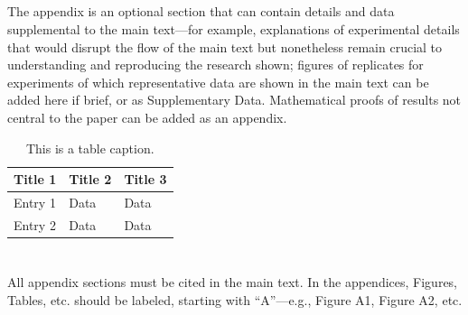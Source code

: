 \documentclass[journal,article,submit,pdftex,moreauthors]{Definitions/mdpi}
\begin{document}
\subsection[\appendixname~\thesubsection]{}
The appendix is an optional section that can contain details and data supplemental to the main text---for example, explanations of experimental details that would disrupt the flow of the main text but nonetheless remain crucial to understanding and reproducing the research shown; figures of replicates for experiments of which representative data are shown in the main text can be added here if brief, or as Supplementary Data. Mathematical proofs of results not central to the paper can be added as an appendix.

\begin{table}[H] 
\caption{This is a table caption.\label{tab5}}
\begin{tabularx}{\textwidth}{CCC}
\toprule
\textbf{Title 1}	& \textbf{Title 2}	& \textbf{Title 3}\\
\midrule
Entry 1		& Data			& Data\\
Entry 2		& Data			& Data\\
\bottomrule
\end{tabularx}
\end{table}

\section[\appendixname~\thesection]{}
All appendix sections must be cited in the main text. In the appendices, Figures, Tables, etc. should be labeled, starting with ``A''---e.g., Figure A1, Figure A2, etc.
\end{document}
